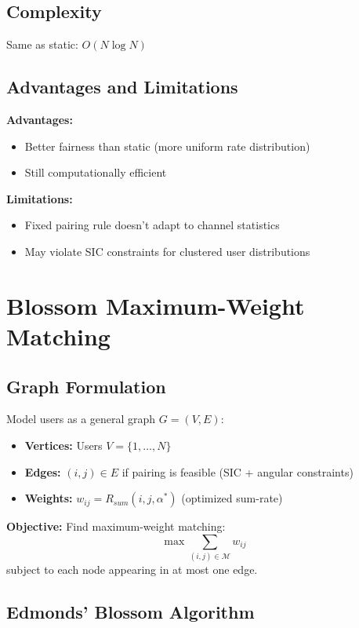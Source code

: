 \subsection{Complexity}
Same as static: $O(N \log N)$

\subsection{Advantages and Limitations}

\textbf{Advantages:}
\begin{itemize}
    \item Better fairness than static (more uniform rate distribution)
    \item Still computationally efficient
\end{itemize}

\textbf{Limitations:}
\begin{itemize}
    \item Fixed pairing rule doesn't adapt to channel statistics
    \item May violate SIC constraints for clustered user distributions
\end{itemize}

\section{Blossom Maximum-Weight Matching}

\subsection{Graph Formulation}

Model users as a general graph $G = (V, E)$:
\begin{itemize}
    \item \textbf{Vertices:} Users $V = \{1, \ldots, N\}$
    \item \textbf{Edges:} $(i,j) \in E$ if pairing is feasible (SIC + angular constraints)
    \item \textbf{Weights:} $w_{ij} = R_{sum}(i,j,\alpha^*)$ (optimized sum-rate)
\end{itemize}

\textbf{Objective:} Find maximum-weight matching:
\begin{equation}
\max \sum_{(i,j) \in \mathcal{M}} w_{ij}
\end{equation}
subject to each node appearing in at most one edge.

\subsection{Edmonds' Blossom Algorithm}

